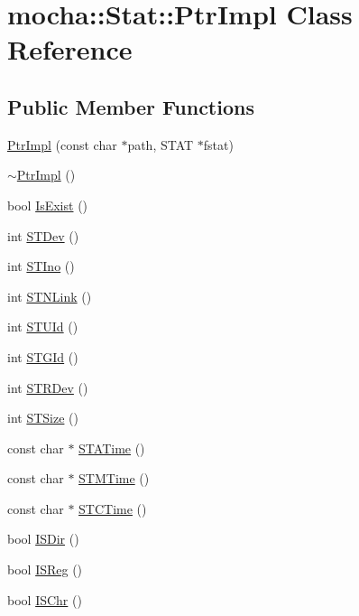 \hypertarget{classmocha_1_1_stat_1_1_ptr_impl}{
\section{mocha::Stat::PtrImpl Class Reference}
\label{classmocha_1_1_stat_1_1_ptr_impl}
}
\subsection*{Public Member Functions}
\begin{DoxyCompactItemize}
\item 
\hyperlink{classmocha_1_1_stat_1_1_ptr_impl_ac087cf18292376b4d0f6dc03f3ecdb5e}{PtrImpl} (const char $\ast$path, STAT $\ast$fstat)
\item 
\hyperlink{classmocha_1_1_stat_1_1_ptr_impl_a91072eed8595a0dec8670263f3ab4fc3}{$\sim$PtrImpl} ()
\item 
bool \hyperlink{classmocha_1_1_stat_1_1_ptr_impl_ad0fb0bb08c5123b823388f3008673dfd}{IsExist} ()
\item 
int \hyperlink{classmocha_1_1_stat_1_1_ptr_impl_ae63275816bd51748b17e55a6c8034907}{STDev} ()
\item 
int \hyperlink{classmocha_1_1_stat_1_1_ptr_impl_a0adc36801ccdc7176b3f98fdf58a9a94}{STIno} ()
\item 
int \hyperlink{classmocha_1_1_stat_1_1_ptr_impl_ae6085427a2ebb21e58ee857ef4033d24}{STNLink} ()
\item 
int \hyperlink{classmocha_1_1_stat_1_1_ptr_impl_a2e84f62499259f38f125af2eeba15684}{STUId} ()
\item 
int \hyperlink{classmocha_1_1_stat_1_1_ptr_impl_abc6e6c0583096a5e130b83c9453a6798}{STGId} ()
\item 
int \hyperlink{classmocha_1_1_stat_1_1_ptr_impl_a20db6131725f0960457eb3c165b3ed78}{STRDev} ()
\item 
int \hyperlink{classmocha_1_1_stat_1_1_ptr_impl_a430567fb7ca035b7fbfe3276c2150969}{STSize} ()
\item 
const char $\ast$ \hyperlink{classmocha_1_1_stat_1_1_ptr_impl_aed42544d0319b09f3045e1adf71be2b0}{STATime} ()
\item 
const char $\ast$ \hyperlink{classmocha_1_1_stat_1_1_ptr_impl_a700a272ca859c5178f019c33170c3d75}{STMTime} ()
\item 
const char $\ast$ \hyperlink{classmocha_1_1_stat_1_1_ptr_impl_addf7274266a1d8ab2afe81ec8f3d1e86}{STCTime} ()
\item 
bool \hyperlink{classmocha_1_1_stat_1_1_ptr_impl_ad8fef8fe886696c04609eb7820fae905}{ISDir} ()
\item 
bool \hyperlink{classmocha_1_1_stat_1_1_ptr_impl_a3299ae7e80e66341e8d7ab1970dd3d3f}{ISReg} ()
\item 
bool \hyperlink{classmocha_1_1_stat_1_1_ptr_impl_a0e1e27601e9ddd667004d24d817ef5c7}{ISChr} ()
\end{DoxyCompactItemize}
